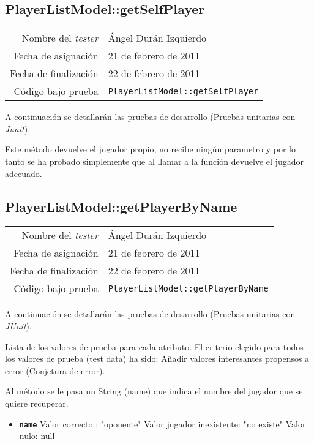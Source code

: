 \subsection{PlayerListModel::getSelfPlayer}

{\small
\begin{tabular}{r|l}
Nombre del \textit{tester} & \'Angel Dur\'an Izquierdo\\
Fecha de asignación & 21 de febrero de 2011 \\
Fecha de finalización & 22 de febrero de 2011 \\
Código bajo prueba & \texttt{PlayerListModel::getSelfPlayer}
\end{tabular}
}

A continuación se detallarán las pruebas de desarrollo (Pruebas unitarias con \textit{Junit}).

Este m\'etodo devuelve el jugador propio, no recibe ning\'un parametro y por lo tanto se ha probado simplemente que al llamar a la funci\'on devuelve el jugador adecuado.

\subsection{PlayerListModel::getPlayerByName}

{\small
\begin{tabular}{r|l}
Nombre del \textit{tester} & \'Angel Dur\'an Izquierdo\\
Fecha de asignación & 21 de febrero de 2011 \\
Fecha de finalización & 22 de febrero de 2011 \\
Código bajo prueba & \texttt{PlayerListModel::getPlayerByName}
\end{tabular}
}

A continuación se detallarán las pruebas de desarrollo (Pruebas unitarias con \textit{JUnit}).

Lista de los valores de prueba para cada atributo.
El criterio elegido para todos los valores de prueba (test data) ha sido: Añadir valores interesantes propensos a error (Conjetura de error).

Al m\'etodo se le pasa un String (name) que indica el nombre del jugador que se quiere recuperar.

\begin{itemize}
\item \textbf{\texttt{name}}
\subitem Valor correcto : "oponente"
\subitem Valor jugador inexistente: "no existe"
\subitem Valor nulo: null
\end{itemize}

